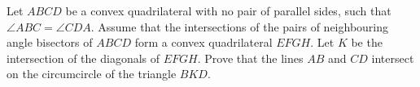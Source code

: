 Let $ ABCD $ be a convex quadrilateral with no pair of parallel sides, such that $ \angle ABC  = \angle CDA $. Assume that the intersections of the pairs of neighbouring angle bisectors of $ ABCD $ form a convex quadrilateral $ EFGH $. Let $ K $ be the intersection of the diagonals of $ EFGH$. Prove that the lines $ AB $ and $ CD $ intersect on the circumcircle of the triangle $ BKD $.